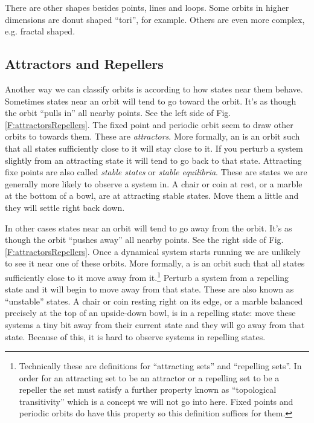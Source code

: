 There are other shapes besides points, lines and loops. Some orbits in higher dimensions are donut shaped ``tori'', for example. Others are even more complex, e.g. fractal shaped.

\subsection{Attractors and Repellers}

   Another way we can classify orbits is according to how states near  them behave. Sometimes states near an orbit will tend to  go toward the orbit. It's as though the orbit ``pulls in'' all nearby points. See the left side of Fig. \ref{F:attractorsRepellers}. The fixed point and periodic orbit seem to draw other orbits to towards them. These are \emph{attractors}. More formally, an  is an orbit such that all states sufficiently close to it will stay close to it. If you perturb a system slightly from an attracting state it will tend to go back to that state. Attracting fixe points are also called \emph{stable states} or \emph{stable equilibria}. These are states we are generally more likely to observe a system in. A chair or coin at rest, or a marble at the bottom of a bowl, are at attracting stable states. Move them a little and they will settle right back down. 

 In other cases states near an orbit will tend to go away from the orbit.
It's as though the orbit ``pushes away'' all nearby points. See the right side of Fig. \ref{F:attractorsRepellers}. Once a dynamical system starts running we are unlikely to see it near one of these 
orbits. More formally, a  is an orbit such that all states sufficiently close 
to it move away from it.\footnote{Technically these are definitions for 
``attracting sets'' and ``repelling sets''. In order for an attracting set to 
be an attractor or a repelling set to be a repeller the set must satisfy a 
further property known as ``topological transitivity'' which is a concept we
will not go into here. Fixed points and periodic orbits do have this property 
so this definition suffices for them.}  Perturb a system from a repelling state and it will begin to move away from that state. These are also known as ``unstable'' states. A chair or coin resting right on its edge, or a marble balanced precisely at the top of an upside-down bowl, is in a repelling state: move these systems a tiny bit away from their current state and they will go away from that state. Because of this, it is hard to observe systems in repelling states.

